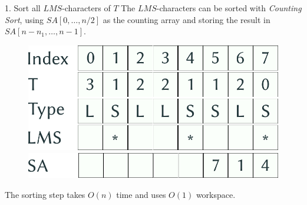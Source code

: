 \documentclass{beamer}
\begin{document}
  \begin{frame}{1. Sort all $LMS$-characters of $T$}\label{1}
    The $LMS$-characters can be sorted with \textit{Counting Sort}, using $SA[0, \dots, n/2]$ as the counting array and storing the result in $SA[n-n_1, \dots, n-1]$.
\hyperlink{AUX1}{}
    \begin{figure}
    \centering
    \begin{minipage}{.5\textwidth}
      \centering
      \includegraphics[width=.9\linewidth]{img/preliminary.pdf}
    \end{minipage}%
    \begin{minipage}{.5\textwidth}
      \centering
      \includegraphics[width=.9\linewidth]{img/SA_1.pdf}
    \end{minipage}
    \end{figure}

    The sorting step takes $O(n)$ time and uses $O(1)$ workspace.

  \end{frame}
\end{document}
